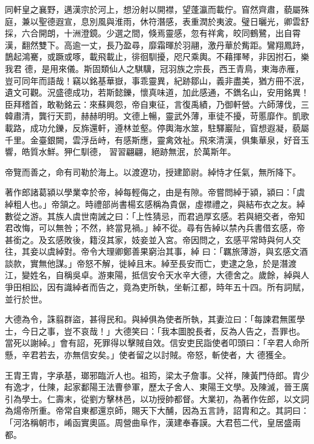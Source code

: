 \begin{pinyinscope}
 同軒皇之襄野，邁漢宗於河上，想汾射以開襟，望蓬瀛而載佇。窅然齊肅，藐屬殊庭，兼以聖德遐宣，息別風與淮雨，休符潛感，表重潤於夷波。璧日曬光，卿雲舒採，六合開朗，十洲澄鏡。少選之間，倏焉靈感，忽有祥禽，皎同鶴鷺，出自霄漢，翻然雙下。高逾一丈，長乃盈尋，靡霜暉於羽翮，激丹華於觜距。鸞翔鳳跱，鵲起鴻騫，或蹶或啄，載飛載止，徘徊馴擾，咫尺乘輿。不藉揮琴，非因拊石，樂我君
 德，是用來儀。斯固類仙人之騏驥，冠羽族之宗長，西王青鳥，東海赤雁，豈可同年而語哉！竊以銘基華嶽，事乖靈異，紀跡鄒山，義非盡美，猶方冊不泯，遺文可觀。況盛德成功，若斯懿鑠，懷真味道，加此感通，不鐫名山，安用銘異！臣拜稽首，敢勒銘云：來蘇興怨，帝自東征，言復禹績，乃御軒營。六師薄伐，三韓肅清，龔行天罰，赫赫明明。文德上暢，靈武外薄，車徒不擾，苛慝靡作。凱歌載路，成功允鑠，反旆還軒，遵林並壑。停輿海水筮，駐驛巖阯，窅想遐凝，藐屬千里。金臺銀闕，雲浮岳峙，有感斯應，靈禽效祉。飛來清漢，俱集華泉，好音玉響，皓質水鮮。狎仁馴德，
 習習翩翩，絕跡無泯，於萬斯年。



 帝覽而善之，命有司勒於海上。以渡遼功，授建節尉。綽恃才任氣，無所降下。



 著作郎諸葛潁以學業幸於帝，綽每輕侮之，由是有隙。帝嘗問綽于潁，潁曰：「虞綽粗人也。」帝頷之。時禮部尚書楊玄感稱為貴倨，虛襟禮之，與結布衣之友。綽數從之游。其族人虞世南誡之曰：「上性猜忌，而君過厚玄感。若與絕交者，帝知君改悔，可以無咎；不然，終當見禍。」綽不從。尋有告綽以禁內兵書借玄感，帝甚銜之。及玄感敗後，籍沒其家，妓妾並入宮。帝因問之，玄感平常時與何人交往，其妾以虞綽對。帝令大理卿鄭善果窮治其事，綽
 曰：「羈旅薄游，與玄感文酒談款，實無他謀。」帝怒不解，徙綽且末。綽至長安而亡，吏逮之急，於是潛渡江，變姓名，自稱吳卓。游東陽，抵信安令天水辛大德，大德舍之。歲餘，綽與人爭田相訟，因有識綽者而告之，竟為吏所執，坐斬江都，時年五十四。所有詞賦，並行於世。



 大德為令，誅翦群盜，甚得民和。與綽俱為使者所執，其妻泣曰：「每諫君無匿學士，今日之事，豈不哀哉！」大德笑曰：「我本圖脫長者，反為人告之，吾罪也。當死以謝綽。」會有詔，死罪得以擊賊自效。信安吏民詣使者叩頭曰：「辛君人命所懸，辛君若去，亦無信安矣。」使者留之以討賊。帝怒，斬使者，大
 德獲全。



 王胄王胄，字承基，瑯邪臨沂人也。祖筠，梁太子詹事。父祥，陳黃門侍郎。胄少有逸才，仕陳，起家鄱陽王法曹參軍，歷太子舍人、東陽王文學。及陳滅，晉王廣引為學士。仁壽末，從劉方擊林邑，以功授帥都督。大業初，為著作佐郎，以文詞為煬帝所重。帝常自東都還京師，賜天下大酺，因為五言詩，詔胄和之。其詞曰：「河洛稱朝市，崤函實奧區。周營曲阜作，漢建奉春謨。大君苞二代，皇居盛兩都。




\end{pinyinscope}

